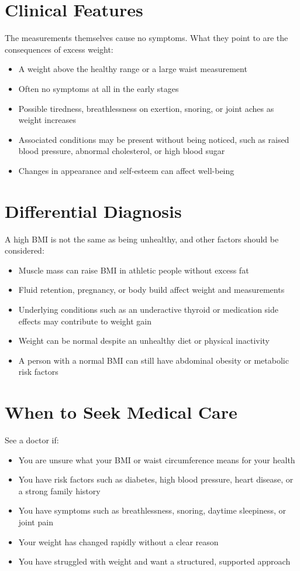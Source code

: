 \section*{Clinical Features}
The measurements themselves cause no symptoms. What they point to are the consequences of excess weight:

\begin{itemize}
    \item A weight above the healthy range or a large waist measurement
    \item Often no symptoms at all in the early stages
    \item Possible tiredness, breathlessness on exertion, snoring, or joint aches as weight increases
    \item Associated conditions may be present without being noticed, such as raised blood pressure, abnormal cholesterol, or high blood sugar
    \item Changes in appearance and self-esteem can affect well-being
\end{itemize}

\section*{Differential Diagnosis}
A high BMI is not the same as being unhealthy, and other factors should be considered:

\begin{itemize}
    \item Muscle mass can raise BMI in athletic people without excess fat
    \item Fluid retention, pregnancy, or body build affect weight and measurements
    \item Underlying conditions such as an underactive thyroid or medication side effects may contribute to weight gain
    \item Weight can be normal despite an unhealthy diet or physical inactivity
    \item A person with a normal BMI can still have abdominal obesity or metabolic risk factors
\end{itemize}

\section*{When to Seek Medical Care}
See a doctor if:

\begin{itemize}
    \item You are unsure what your BMI or waist circumference means for your health
    \item You have risk factors such as diabetes, high blood pressure, heart disease, or a strong family history
    \item You have symptoms such as breathlessness, snoring, daytime sleepiness, or joint pain
    \item Your weight has changed rapidly without a clear reason
    \item You have struggled with weight and want a structured, supported approach
\end{itemize}

